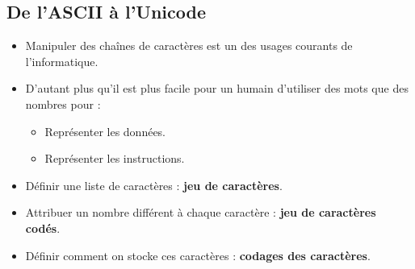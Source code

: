 \subsection{De l'ASCII à l'Unicode}
\begin{slide}
	\begin{itemize}
		\item Manipuler des chaînes de caractères est un des usages courants de l'informatique.
		\item D'autant plus qu'il est plus facile pour un humain d'utiliser des mots que des nombres pour :
			\begin{itemize}
				\item Représenter les données.
				\item Représenter les instructions.
			\end{itemize}
	\end{itemize}
\end{slide}
\begin{slide}
	\begin{itemize}
		\item Définir une liste de caractères : \textbf{jeu de caractères}.
		\item Attribuer un nombre différent à chaque caractère : \textbf{jeu de caractères codés}.
		\item Définir comment on stocke ces caractères : \textbf{codages des caractères}.
	\end{itemize}
\end{slide}

